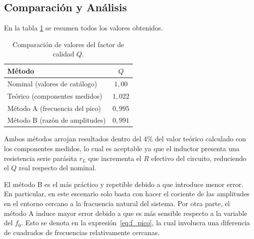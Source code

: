 \subsection{Comparación y Análisis}

En la tabla \ref{tab:Q_comparacion} se resumen todos los valores obtenidos.

\begin{table}[H]
    \centering
    \begin{tabular}{lc}
        \toprule
        Método & $Q$ \\
        \midrule
        Nominal (valores de catálogo)       & $1{,}00$  \\
        Teórico (componentes medidos)       & $1{,}022$ \\
        Método A (frecuencia del pico)      & $0{,}995$ \\
        Método B (razón de amplitudes)      & $0{,}991$ \\
        \bottomrule
    \end{tabular}
    \caption{Comparación de valores del factor de calidad $Q$.}
    \label{tab:Q_comparacion}
\end{table}


Ambos métodos arrojan resultados dentro del $4\%$ del valor teórico calculado 
con los componentes medidos, lo cual es aceptable ya que el inductor presenta una resistencia 
serie parásita $r_L$ que incrementa el $R$ efectivo del circuito, reduciendo el 
$Q$ real respecto del nominal.


El método B es el más práctico y repetible debido a que introduce menor error. En particular, en este
escenario solo basta con hacer el cociente de las amplitudes en el entorno cercano a la fracuencia natural
del sistema. Por otra parte, el método A induce mayor error debido a que es más sensible respecto a la 
variable del $f_0$. Esto se denota en la expresión~\ref{eq:f_pico}, la cual involucra una diferencia de
cuadrados de frecuencias relativamente cercanas.

